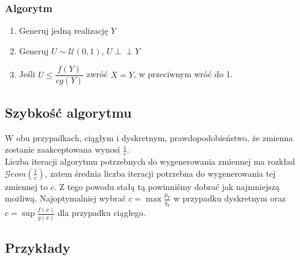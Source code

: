 \documentclass[12pt]{mwrep}
\newcommand{\indep}{\perp \!\!\! \perp}
\begin{document}
	\subsubsection{Algorytm}
	\begin{enumerate}[leftmargin=10mm]
		\item Generuj jedną realizację $Y$
		\item Generuj $U\sim \mathcal{U}(0,1)$, $U\indep Y$
		\item Jeśli $U\leqslant\dfrac{f(Y)}{cg(Y)}$ zwróć $X=Y$, w przeciwnym wróć do 1.
	\end{enumerate}

	\subsection{Szybkość algorytmu}
	\noindent W obu przypadkach, ciągłym i dyskretnym, prawdopodobieństwo, że zmienna zostanie zaakceptowana wynosi $\frac{1}{c}$.\\
	Liczba iteracji algorytmu potrzebnych do wygenerowania zmiennej ma rozkład $\mathcal{G}eom(\frac{1}{c})$, zatem średnia liczba iteracji potrzebna do wygenerowania tej zmiennej to $c$. Z tego powodu stałą tą powinniśmy dobrać jak najmniejszą możliwą. Najoptymalniej wybrać $c=\max\frac{p_Y}{q_Y}$ w przypadku dyskretnym oraz $c=\sup\frac{f(x)}{g(x)}$ dla przypadku ciągłego.

	\subsection{Przykłady}
	
\end{document}
